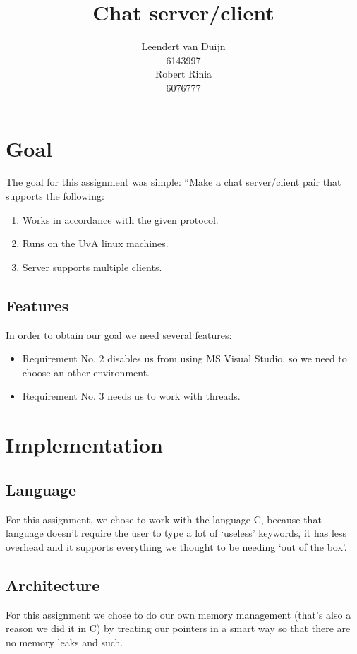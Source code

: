 \documentclass[a4paper]{article}
\author{Leendert van Duijn\\6143997\\Robert Rinia\\6076777}
\title{Chat server/client}
\begin{document}
\maketitle
\tableofcontents
\newpage
\section{Goal}
The goal for this assignment was simple: ``Make a chat server/client pair that
supports the following:\\

\begin{enumerate}
\item \label{1}Works in accordance with the given protocol.
\item \label{2}Runs on the UvA linux machines.
\item \label{3}Server supports multiple clients.
\end{enumerate}

\subsection{Features}
In order to obtain our goal we need several features:\\
\begin{itemize}
\item Requirement No. $2$ disables us from using MS Visual Studio, so we need
to choose an other environment.
\item Requirement No. $3$ needs us to work with threads.
\end{itemize}

\section{Implementation}
\subsection{Language}
For this assignment, we chose to work with the language C, because that
language doesn't require the user to type a lot of `useless' keywords, it has
less overhead and it supports everything we thought to be needing `out of the
box'.

\subsection{Architecture}
For this assignment we chose to do our own memory management (that's also a
reason we did it in C) by treating our pointers in a smart way so that there
are no memory leaks and such.
\end{document}

